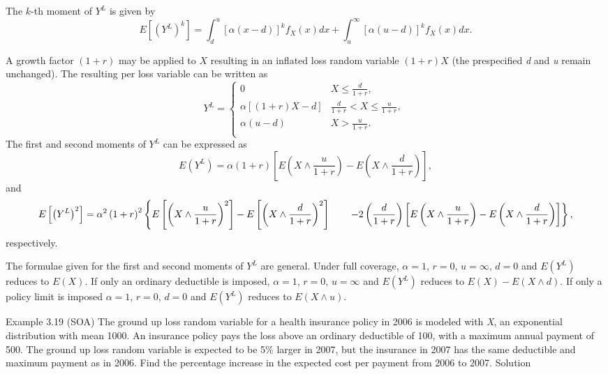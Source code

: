 \documentclass[]{book}
\theoremstyle{definition}
\theoremstyle{definition}
\theoremstyle{definition}
\theoremstyle{remark}
\begin{document}
The \(k\)-th moment of \(Y^{L}\) is given by
\[E\left\lbrack \left( Y^{L} \right)^{k} \right\rbrack = \int_{d}^{u}\left\lbrack \alpha\left( x - d \right) \right\rbrack^{k}f_{X}\left( x \right)dx + \int_{u}^{\infty}\left\lbrack \alpha\left( u - d \right) \right\rbrack^{k}f_{X}\left( x \right) dx .\]

A growth factor \(\left( 1 + r \right)\) may be applied to \(X\)
resulting in an inflated loss random variable \(\left( 1 + r \right)X\)
(the prespecified \emph{d} and \emph{u} remain unchanged). The resulting
per loss variable can be written as \[Y^{L} = \left\{ \begin{matrix}
0 & X \leq \frac{d}{1 + r}, \\
\alpha\left\lbrack \left( 1 + r \right)X - d \right\rbrack & \frac{d}{1 + r} <  X \leq \frac{u}{1 + r}, \\
\alpha\left( u - d \right) & X > \frac{u}{1 + r}. \\
\end{matrix} \right.\ \] The first and second moments of \(Y^{L}\) can
be expressed as
\[E\left( Y^{L} \right) = \alpha\left( 1 + r \right)\left\lbrack E\left( X \land \frac{u}{1 + r} \right) - E\left( X \land \frac{d}{1 + r} \right) \right\rbrack,\]
and \[E\left\lbrack \left( Y^{L} \right)^{2} 
\right\rbrack = \alpha^{2}\left( 1 + r \right)^{2}  \left\{ E\left\lbrack \left( X \land \frac{u}{1 + r} \right)^{2} \right\rbrack - E\left\lbrack \left( X \land \frac{d}{1 + r} \right)^{2} \right\rbrack  \right. \\
\left. \ \ \ \ \ - 2\left( \frac{d}{1 + r} \right)\left\lbrack E\left( X \land \frac{u}{1 + r} \right) - E\left( X \land \frac{d}{1 + r} \right) \right\rbrack \right\} ,\]
respectively.

The formulae given for the first and second moments of \(Y^{L}\) are
general. Under full coverage, \(\alpha = 1\), \(r = 0\), \(u = \infty\),
\(d = 0\) and \(E\left( Y^{L} \right)\) reduces to
\(E\left( X \right)\). If only an ordinary deductible is imposed,
\(\alpha = 1\), \(r = 0\), \(u = \infty\) and \(E\left( Y^{L} \right)\)
reduces to \(E\left( X \right) - E\left( X \land d \right)\). If only a
policy limit is imposed \(\alpha = 1\), \(r = 0\), \(d = 0\) and
\(E\left( Y^{L} \right)\) reduces to \(E\left( X \land u \right)\).

Example 3.19 (SOA) The ground up loss random variable for a health
insurance policy in 2006 is modeled with \emph{X}, an exponential
distribution with mean 1000. An insurance policy pays the loss above an
ordinary deductible of 100, with a maximum annual payment of 500. The
ground up loss random variable is expected to be 5\% larger in 2007, but
the insurance in 2007 has the same deductible and maximum payment as in
2006. Find the percentage increase in the expected cost per payment from
2006 to 2007. Solution
\end{document}
